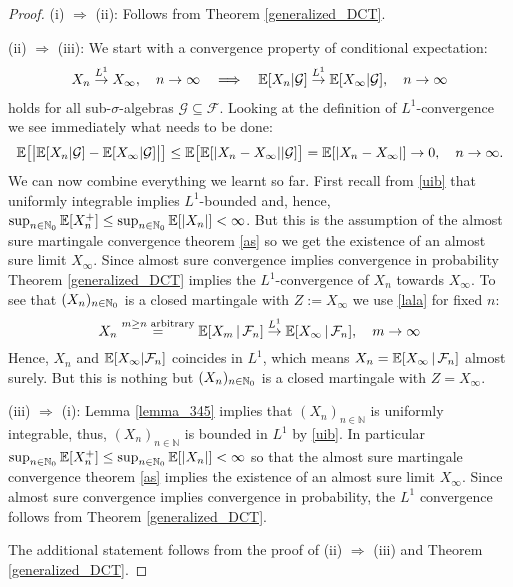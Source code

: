 \begin{proof}[Proof]
	(i) $\Rightarrow$ (ii): Follows from Theorem \ref{generalized_DCT}.\smallskip
	
	
	(ii) $\Rightarrow$ (iii): We start with a convergence property of conditional expectation:
	\begin{align}\label{lala}
		 X_n \overset{L^1}{\to} X_{\infty},\quad n\to\infty\quad \Longrightarrow \quad \mathbb{E}[X_n|\mathcal G] \overset{L^1}{\rightarrow} \mathbb{E}[X_{\infty} | \mathcal G], \quad n \to \infty
	\end{align}
	holds for all sub-$\sigma$-algebras $\mathcal G\subseteq \mathcal F$. Looking at the definition of $L^1$-convergence we see immediately what needs to be done:
	\begin{align*}
		\mathbb{E} \big[\big\lvert \mathbb{E}[X_n|\mathcal G] - \mathbb{E}[X_{\infty}|\mathcal G]\big\rvert \big] \leq \mathbb{E} \big[ \mathbb{E}[ \lvert X_n - X_{\infty} \rvert |\mathcal G]\big] = \mathbb{E}[\lvert X_n - X_{\infty} \rvert] \to 0,\quad n\to\infty.
	\end{align*}
	We can now combine everything we learnt so far. First recall from \eqref{uib} that uniformly integrable implies $L^1$-bounded and, hence, $\sup_{n\in\mathbb{N}_0} \mathbb{E}{[X_n^+]}\leq \sup_{n\in\mathbb{N}_0}\mathbb{E}[|X_n|]<\infty$. But this is the assumption of the almost sure martingale convergence theorem \ref{as} so we get the existence of an almost sure limit $X_\infty$. Since almost sure convergence implies convergence in probability Theorem \ref{generalized_DCT} implies the $L^1$-convergence of $X_n$ towards $X_\infty$. To see that $(X_n)_{n\in\mathbb{N}_0}$ is a closed martingale with $Z:=X_\infty$ we use \eqref{lala} for fixed $n$:
	$$X_n \overset{m\geq n \text{ arbitrary}}{=} \mathbb{E}[X_m\,|\,\mathcal{F}_n] \overset{L^1}{\rightarrow} \mathbb{E}[X_{\infty}\,|\,\mathcal{F}_n],\quad m\to \infty$$
	Hence, $X_n$ and $\mathbb{E}[X_\infty|\mathcal F_n]$ coincides in $L^1$, which means $X_n = \mathbb{E}[X_{\infty}\,|\,\mathcal{F}_n]$ almost surely. But this is nothing but $(X_n)_{n\in \mathbb{N}_0}$ is a closed martingale with $Z=X_\infty$.\smallskip
	
	(iii) $\Rightarrow$ (i): Lemma \ref{lemma_345} implies that $(X_n)_{n\in\mathbb{N}}$ is uniformly integrable, thus, $(X_n)_{n\in\mathbb{N}}$ is bounded in $L^1$ by \ref{uib}. In particular $\sup_{n\in\mathbb{N}_0} \mathbb{E}{[X_n^+]}\leq \sup_{n\in\mathbb{N}_0}\mathbb{E}[|X_n|]<\infty$ so that the almost sure martingale convergence theorem \ref{as} implies the existence of an almost sure limit $X_{\infty}$. Since almost sure convergence implies convergence in probability, the $L^1$ convergence follows from Theorem \ref{generalized_DCT}.\smallskip
	
	The additional statement follows from the proof of (ii) $\Rightarrow$ (iii) and Theorem \ref{generalized_DCT}.
\end{proof}

